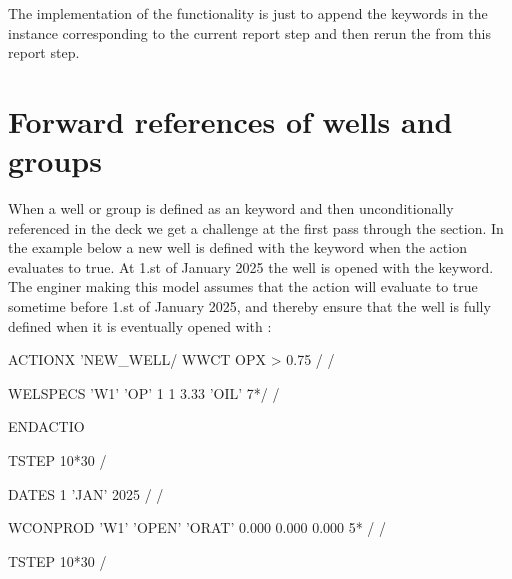 The implementation of the \actionx{} functionality is just to append the
\actionx{} keywords in the  instance corresponding to
the current report step and then rerun the
 from this report step.



\section{Forward references of wells and groups}
When a well or group is defined as an \actionx{} keyword and then
unconditionally referenced in the deck we get a challenge at the first pass
through the  section. In the example below a new well  is
defined with the  keyword when the action 
evaluates to true. At 1.st of January 2025 the well  is opened with the
 keyword. The enginer making this model assumes that the
 action will evaluate to true sometime before 1.st of
January 2025, and thereby ensure that the well is fully defined when it is
eventually opened with :
\begin{deck}
ACTIONX
   'NEW_WELL/
   WWCT OPX  > 0.75 /
/

WELSPECS
  'W1'  'OP'  1 1 3.33  'OIL' 7*/
/

ENDACTIO

TSTEP
  10*30 /

DATES
   1 'JAN' 2025 /
/

WCONPROD
 'W1'      'OPEN'      'ORAT'      0.000      0.000      0.000  5* /
/

TSTEP
  10*30 /

\end{deck}

